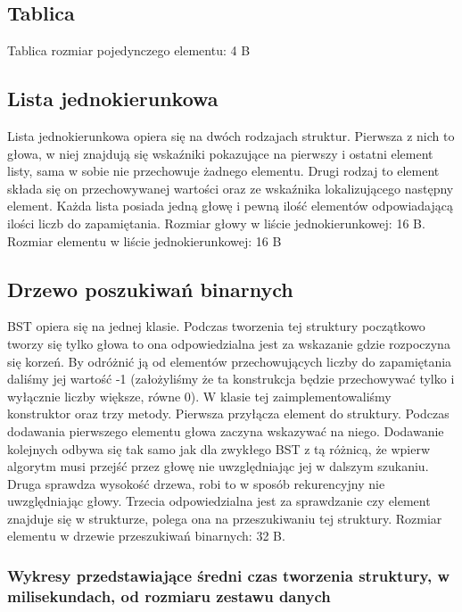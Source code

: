 \documentclass[polish,polish,a4paper]{article}
\begin{document}
\subsection*{Tablica}

Tablica rozmiar pojedynczego elementu:
4 B

\subsection*{Lista jednokierunkowa}

Lista jednokierunkowa opiera się na dwóch rodzajach struktur. Pierwsza z nich to głowa, w niej znajdują się wskaźniki pokazujące na pierwszy i ostatni element listy, sama w sobie nie przechowuje żadnego elementu. Drugi rodzaj to element składa się on przechowywanej wartości oraz ze wskaźnika lokalizującego następny element. Każda lista posiada jedną głowę i pewną ilość elementów odpowiadającą ilości liczb do zapamiętania.
Rozmiar głowy w liście jednokierunkowej:
16 B.
Rozmiar elementu w liście jednokierunkowej:
16 B

\subsection*{Drzewo poszukiwań binarnych}
BST opiera się na jednej klasie. Podczas tworzenia tej struktury początkowo tworzy się tylko głowa to ona odpowiedzialna jest za wskazanie gdzie rozpoczyna się korzeń. By odróżnić ją od elementów przechowujących liczby do zapamiętania daliśmy jej wartość -1 (założyliśmy że ta konstrukcja będzie przechowywać tylko i wyłącznie liczby większe, równe 0). W klasie tej zaimplementowaliśmy konstruktor oraz trzy metody. Pierwsza przyłącza element do struktury. Podczas dodawania pierwszego elementu głowa zaczyna wskazywać na niego. Dodawanie kolejnych odbywa się tak samo jak dla zwykłego  BST z tą różnicą, że wpierw algorytm musi przejść przez głowę nie uwzględniając jej w dalszym szukaniu. Druga sprawdza wysokość drzewa, robi to w sposób rekurencyjny nie uwzględniając głowy. Trzecia odpowiedzialna jest za sprawdzanie czy element znajduje się w strukturze, polega ona na przeszukiwaniu tej struktury.
Rozmiar elementu w drzewie przeszukiwań binarnych:
32 B.


	\subsubsection*{Wykresy przedstawiające średni czas tworzenia struktury, w milisekundach, od rozmiaru zestawu danych}
\end{document}
